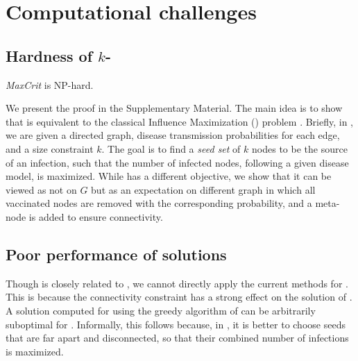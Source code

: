 

\section{Computational challenges}

\subsection{Hardness of $k$-\maxcrit{}}

\begin{theorem}
\label{theorem:nphard}
\emph{MaxCrit} is NP-hard.
\end{theorem}

We present the proof in the Supplementary Material. The main idea is to show that \maxcrit{} is equivalent to
the classical Influence Maximization (\infmax) problem \cite{kempe:sigkdd03}. Briefly, in \infmax, we are given a directed graph, disease transmission probabilities for each edge, and a size constraint $k$. The goal is to find a \emph{seed set} of $k$ nodes to be the source of an infection, such that the number of infected nodes, following a given disease model, is maximized. 
While \maxcrit{} has a different objective, we show that it can be viewed as \infmax{} not on $G$ but as an expectation on
different graph in which all vaccinated nodes are removed with the corresponding probability,
and a meta-node is added to ensure connectivity.


\subsection{Poor performance of \infmax{} solutions}

Though \maxcrit{} is closely related to \infmax, we cannot directly apply the current methods for 
\infmax{}. This is because the connectivity constraint has a strong effect on the solution of \maxcrit{}. A solution computed for \infmax{} using the greedy algorithm of \cite{kempe:sigkdd03} can be arbitrarily suboptimal for \maxcrit{}. Informally, this follows because, in \infmax{}, it is better to choose seeds that are far apart and disconnected, so that their combined number of infections is maximized.

